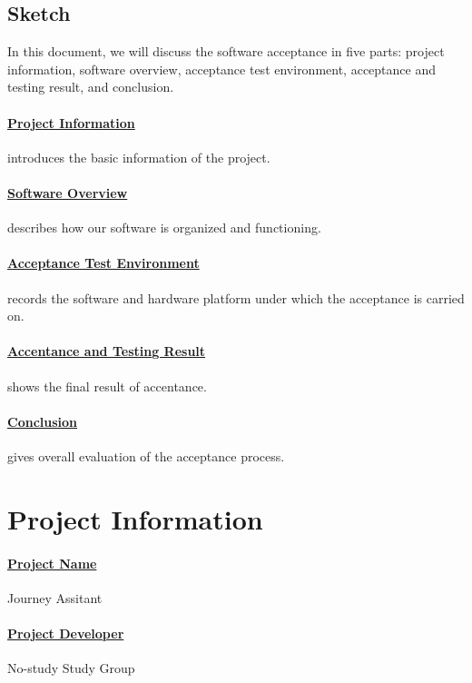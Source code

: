 \documentclass[10pt]{article}
\begin{document}
\subsection{Sketch}
In this document, we will discuss the software acceptance in five parts: project information, software overview, acceptance test environment, acceptance and testing result, and conclusion. 

\paragraph{\underline{Project Information}} 
introduces the basic information of the project.

\paragraph{\underline{Software Overview}} 
describes how our software is organized and functioning.

\paragraph{\underline{Acceptance Test Environment}} 
records the software and hardware platform under which the acceptance is carried on. 

\paragraph{\underline{Accentance and Testing Result}}
shows the final result of accentance.

\paragraph{\underline{Conclusion}}
gives overall evaluation of the acceptance process.

\section{Project Information}
\paragraph{\underline{Project Name}} 
Journey Assitant

\paragraph{\underline{Project Developer}} 
No-study Study Group
\end{document}
